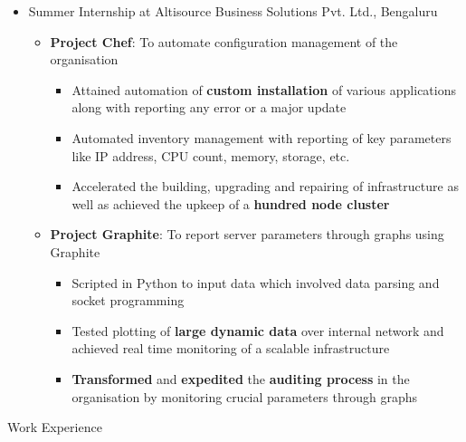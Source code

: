 \documentclass{article}
\begin{document}
\begin{itemize}[leftmargin=0.07cm]
\item {\large Summer Internship at Altisource Business Solutions Pvt. Ltd., Bengaluru}\hspace*{\fill}
\vspace{-0cm}
	\begin{itemize}[leftmargin=0.07cm]
	\item \textbf{Project Chef}: To automate configuration management of the organisation\\
	\vspace{-0.2cm}
	\begin{itemize}
	\item Attained automation of \textbf{custom installation} of various applications along with reporting any error or a major update
	\item Automated inventory management with reporting  of key parameters like IP address, CPU count, memory, storage, etc.
    \item Accelerated the building, upgrading and repairing of infrastructure as well as achieved the upkeep of a \textbf{hundred node cluster} \end{itemize}
	\vspace{0cm}
	\item \textbf{Project Graphite}: To report server parameters through graphs using Graphite\\
	\vspace{-0.2cm}
	\begin{itemize}
	\item Scripted in Python to input data which involved data parsing and socket programming
	\item Tested plotting of \textbf{large dynamic data} over internal network and achieved real time monitoring of a scalable infrastructure 
	\item \textbf{Transformed} and \textbf{expedited} the \textbf{auditing process} in the organisation by monitoring crucial parameters through graphs 
	\end{itemize}
	
	\end{itemize}
\end{itemize}
{\Large Work Experience}
\renewcommand{\labelitemii}{$\bullet$}
\end{document}
